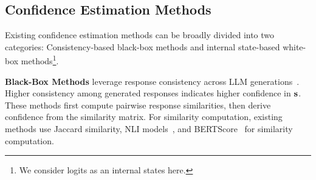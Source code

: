 



\subsection{Confidence Estimation Methods}
\label{confidence_methods}

Existing confidence estimation methods can be broadly divided into two categories: Consistency-based black-box methods and internal state-based white-box methods\footnote{We consider logits as an internal states here.}.



\textbf{Black-Box Methods} leverage response consistency across LLM generations~\cite{lin2024generating,manakul-etal-2023-selfcheckgpt}. 
Higher consistency among generated responses indicates higher confidence in $\mathbf{s}$. 
These methods first compute pairwise response similarities, then derive confidence from the similarity matrix.
For similarity computation, existing methods use
Jaccard similarity, NLI models~\cite{he2021deberta}, and BERTScore~\cite{Zhang2020BERTScore} for similarity computation.


